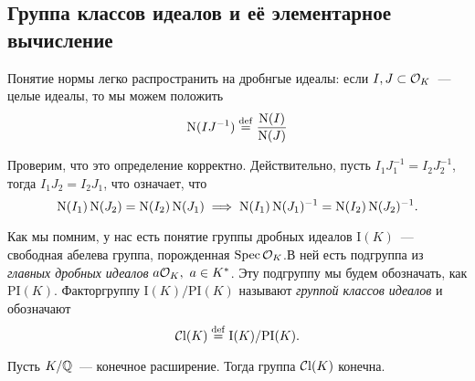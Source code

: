 	\subsection{Группа классов идеалов и её элементарное вычисление}

	Понятие нормы легко распространить на дробнгые идеалы: если $I, J \subset \mathcal{O}_{K}$~--- целые идеалы, то мы можем положить 
	\[
		\operatorname{\mathrm{N}}(I J^{-1}) \stackrel{\mathrm{def}}{=} \frac{\operatorname{\mathrm{N}}(I)}{\operatorname{\mathrm{N}}(J)} 
	\]

	Проверим, что это определение корректно. Действительно, пусть $I_1 J_1^{-1} = I_{2} J_{2}^{-1}$, тогда  $I_1 J_2 = I_2 J_1$, что означает, что 
	\[
		\operatorname{\mathrm{N}}(I_1)\operatorname{\mathrm{N}}(J_2) = \operatorname{\mathrm{N}}(I_2)\operatorname{\mathrm{N}}(J_1) \implies \operatorname{\mathrm{N}}(I_1)\operatorname{\mathrm{N}}(J_1)^{-1} = \operatorname{\mathrm{N}}(I_2) \operatorname{\mathrm{N}}(J_2)^{-1}.
	\]

	Как мы помним, у нас есть понятие группы дробных идеалов $\mathrm{I}(K)$~--- свободная абелева группа, порожденная $\operatorname{Spec}{\mathcal{O}_{K}}$.В ней есть подгруппа из \emph{главных дробных идеалов} $a\cO_{K}, \ a \in K^{*}$.  Эту подгруппу мы будем обозначать, как $\mathrm{PI}(K)$. Факторгруппу $\mathrm{I}(K)/\mathrm{PI}(K)$ называют \emph{группой классов идеалов} и обозначают 
	\[
		\operatorname{\mathcal{C}l}(K) \stackrel{\mathrm{def}}{=} \mathrm{I}(K)/\mathrm{PI}(K).
	\]


	\begin{theorem} 
		Пусть $K/\mathbb{Q}$~--- конечное расширение. Тогда группа $\operatorname{\mathcal{C}l}(K)$ конечна. 
	\end{theorem}

